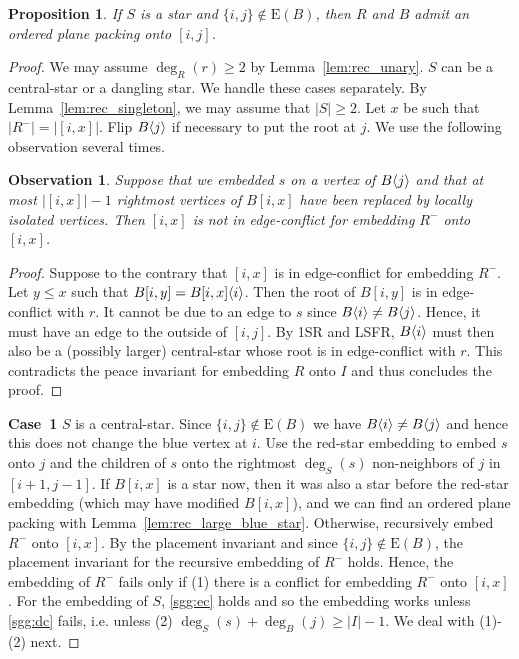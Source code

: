 \documentclass[11pt,a4paper,colorlinks=true,urlcolor=blue,citecolor=red]{article}
\theoremstyle{plain}
\newtheorem{proposition}[theorem]{Proposition}
\newtheorem{observation}[theorem]{Observation}
\newcommand{\case}[1]{\par\vspace{.5\baselineskip}\noindent\textbf{\sffamily Case~#1}}
\newcommand{\EB}{\mathrm{E}(B)}
\begin{document}
\begin{proposition}\label{prop:rec_small_red_star_ij_not_used}
  If $S$ is a star and $\{i,j\}\not\in\EB$, then $R$ and $B$
  admit an ordered plane packing onto $[i,j]$.
\end{proposition}
\begin{proof}
  We may assume $\deg_R(r)\geq 2$ by Lemma~\ref{lem:rec_unary}. $S$ can
  be a central-star or a dangling star. We handle these cases
  separately. By Lemma~\ref{lem:rec_singleton}, we may assume that
  $|S|\geq 2$. Let $x$ be such that $|R^-|=|[i,x]|$. Flip $B\langle{j}\rangle$ if
  necessary to put the root at $j$. We use the following observation
  several times.

  \begin{observation}
    \label{obs:rec_small_red_star_sc}
    Suppose that we embedded $s$ on a vertex of $B\langle{j}\rangle$ and that at
    most $|[i,x]|-1$ rightmost vertices of $B[i,x]$ have been replaced
    by locally isolated vertices. Then $[i,x]$ is not in
    edge-conflict for embedding $R^-$ onto $[i,x]$.
  \end{observation}
  \begin{proof}
    Suppose to the contrary that $[i,x]$ is in edge-conflict for
    embedding $R^-$. Let $y\leq x$ such that
    $B[i,y]=B{[i,x]}\langle{i}\rangle$. Then the root of $B[i,y]$ is in
    edge-conflict with $r$. It cannot be due to an edge to $s$ since
    $B\langle{i}\rangle\neq B\langle{j}\rangle$. Hence, it must have an edge to the
    outside of $[i,j]$. By 1SR and LSFR, $B\langle{i}\rangle$ must then also be
    a (possibly larger) central-star whose root is in edge-conflict with
    $r$. This contradicts the peace invariant for embedding $R$ onto $I$
    and thus concludes the proof.
  \end{proof}

  \case{1} $S$ is a central-star. Since $\{i,j\}\not\in\EB$ we have
  $B\langle{i}\rangle\neq B\langle{j}\rangle$ and hence this does not change the blue
  vertex at $i$. Use the red-star embedding to embed $s$ onto
  $j$ and the children of $s$ onto the rightmost $\deg_S(s)$
  non-neighbors of $j$ in $[i+1,j-1]$. If $B[i,x]$ is a star now, then
  it was also a star before the red-star embedding (which may
  have modified $B[i,x]$), and we can find an ordered plane packing with
  Lemma~\ref{lem:rec_large_blue_star}. Otherwise, recursively embed
  $R^-$ onto $[i,x]$. By the placement invariant and since
  $\{i,j\}\not\in\EB$, the placement invariant for the recursive
  embedding of $R^-$ holds. Hence, the embedding of $R^-$ fails only if
  (1) there is a conflict for embedding $R^-$ onto $[i,x]$. For the
  embedding of $S$, \ref{sgg:ec} holds and so the embedding works unless
  \ref{sgg:dc} fails, i.e. unless (2) $\deg_S(s)+\deg_B(j)\geq |I|-1$.
  We deal with (1)-(2) next.


\end{proof}
\end{document}

